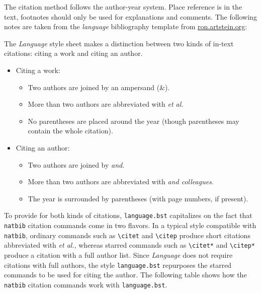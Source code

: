 \documentclass[12pt,letterpaper]{article}
\begin{document}
The citation method follows the author-year system. Place reference is in the text, footnotes should only be used for explanations and comments. The following notes are taken from the \emph{language} bibliography template from \url{ron.artstein.org}:\newline

\noindent
The \emph{Language} style sheet makes a distinction between two kinds of in-text citations: citing a work and citing an author.
\begin{itemize}
\item Citing a work:
  \begin{itemize}
    \setlength{\itemsep}{0pt}
    \setlength{\parsep}{0pt}
  \item Two authors are joined by an ampersand (\&).
  \item More than two authors are abbreviated with \emph{et al.}
  \item No parentheses are placed around the year (though parentheses
    may contain the whole citation). 
  \end{itemize}
\item Citing an author:
  \begin{itemize}
    \setlength{\itemsep}{0pt}
    \setlength{\parsep}{0pt}
  \item Two authors are joined by \emph{and}.
  \item More than two authors are abbreviated with \emph{and colleagues}.
  \item The year is surrounded by parentheses (with page numbers, if
    present).
  \end{itemize} 
\end{itemize}
To provide for both kinds of citations, \verb+language.bst+ capitalizes on the fact that \verb+natbib+ citation commands come in
two flavors. In a typical style compatible with \verb+natbib+, ordinary commands such as \verb+\citet+ and \verb+\citep+ produce short
citations abbreviated with \emph{et al.}, whereas starred commands such as \verb+\citet*+ and \verb+\citep*+ produce a citation with a
full author list. Since \emph{Language} does not require citations with full authors, the style \verb+language.bst+ repurposes the starred commands to be used for citing the author. The following table shows how the \verb+natbib+ citation commands work with \verb+language.bst+.
\end{document}
